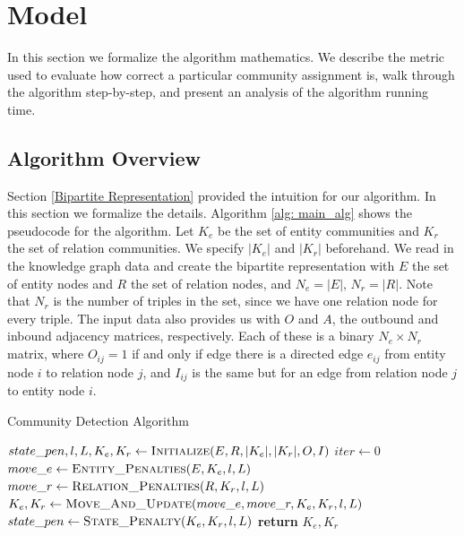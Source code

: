 \documentclass[12pt]{article}
\begin{document}
\section{Model}
\label{Model}

In this section we formalize the algorithm mathematics. We describe the metric
used to evaluate how correct a particular community assignment is, walk through
the algorithm step-by-step, and present an analysis of the algorithm running
time.

\subsection{Algorithm Overview}
\label{Algorithm Overview}

Section \ref{Bipartite Representation} provided the intuition for our algorithm.
In this section we formalize the details. Algorithm \ref{alg: main_alg} shows
the pseudocode for the algorithm. Let $K_e$ be the set of entity communities and
$K_r$ the set of relation communities. We specify $|K_e|$ and $|K_r|$
beforehand. We read in the knowledge graph data and create the bipartite
representation with $E$ the set of entity nodes and $R$ the set of relation
nodes, and $N_e = |E|,\,N_r = |R|$. Note that $N_r$ is the number of triples
in the set, since we have one relation node for every triple.
The input data also provides us with $O$ and $A$, the outbound and inbound
adjacency matrices, respectively. Each of these is a binary $N_e\times N_r$
matrix, where $O_{ij} = 1$ if and only if edge there is a directed edge $e_{ij}$
from entity node $i$ to relation node $j$, and $I_{ij}$ is the same but for an
edge from relation node $j$ to entity node $i$.

\begin{algorithm}[t!]
\caption{Community Detection Algorithm}\label{alg: main_alg}
\begin{algorithmic}[1]

    \State $state\_pen, l, L, K_e, K_r\gets \Call{Initialize}{E, R, |K_e|, |K_r|, O, I}$
    \State $iter\gets 0$
        \State $move\_e\gets \Call{Entity\_Penalties}{E, K_e, l, L}$
        \State $move\_r\gets \Call{Relation\_Penalties}{R, K_r, l, L}$
        \State $K_e,K_r\gets \Call{Move\_And\_Update}{move\_e, move\_r, K_e, K_r, l, L}$
        \State $state\_pen\gets \Call{State\_Penalty}{K_e, K_r, l, L}$
    \EndWhile
    \State \textbf{return} $K_e, K_r$
\EndFunction

\end{algorithmic}
\end{algorithm}
\end{document}

